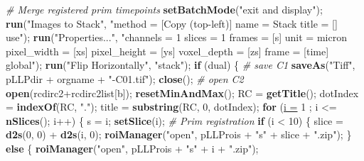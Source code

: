 \documentclass[11pt,singlespacinge,twoside]{reedthesis} %
\newenvironment{Shaded}{}{}
\newcommand{\CommentTok}[1]{\textit{#1}}
\newcommand{\ControlFlowTok}[1]{\textbf{#1}}
\newcommand{\DataTypeTok}[1]{\underline{#1}}
\newcommand{\DecValTok}[1]{#1}
\newcommand{\KeywordTok}[1]{\textbf{#1}}
\newcommand{\NormalTok}[1]{#1}
\newcommand{\OperatorTok}[1]{#1}
\newcommand{\StringTok}[1]{#1}
\theoremstyle{definition}
\theoremstyle{definition}
\theoremstyle{definition}
\theoremstyle{remark}
\begin{document}
\begin{Shaded}
\begin{Highlighting}[numbers=left,,]
    \CommentTok{#   Merge registered prim timepoints}
        \KeywordTok{setBatchMode}\NormalTok{(}\StringTok{"exit and display"}\NormalTok{);}
        \KeywordTok{run}\NormalTok{(}\StringTok{"Images to Stack"}\NormalTok{, }\StringTok{"method = [Copy (top-left)] name = Stack title = [] use"}\NormalTok{);}
        \KeywordTok{run}\NormalTok{(}\StringTok{"Properties..."}\NormalTok{,}
            \StringTok{"channels = 1 slices = 1 frames = [s] unit = micron pixel_width = [xs]}
\StringTok{            pixel_height = [ys] voxel_depth = [zs] frame = [time] global"}\NormalTok{); }
        \KeywordTok{run}\NormalTok{(}\StringTok{"Flip Horizontally"}\NormalTok{, }\StringTok{"stack"}\NormalTok{);}
        \ControlFlowTok{if}\NormalTok{ (dual) \{}
      \CommentTok{# save C1}
          \KeywordTok{saveAs}\NormalTok{(}\StringTok{"Tiff"}\NormalTok{, pLLPdir }\OperatorTok{+}\StringTok{ }\NormalTok{orgname }\OperatorTok{+}\StringTok{ "-C01.tif"}\NormalTok{);}
          \KeywordTok{close}\NormalTok{();}
      \CommentTok{# open C2}
          \KeywordTok{open}\NormalTok{(rcdirc2}\OperatorTok{+}\NormalTok{rcdirc2list[b]);}
            \KeywordTok{resetMinAndMax}\NormalTok{();}
\NormalTok{            RC =}\StringTok{ }\KeywordTok{getTitle}\NormalTok{();}
\NormalTok{            dotIndex =}\StringTok{ }\KeywordTok{indexOf}\NormalTok{(RC, }\StringTok{"."}\NormalTok{);}
\NormalTok{            title =}\StringTok{ }\KeywordTok{substring}\NormalTok{(RC, }\DecValTok{0}\NormalTok{, dotIndex);}
            \ControlFlowTok{for}\NormalTok{ (}\DataTypeTok{i =} \DecValTok{1}\NormalTok{ ; i }\OperatorTok{<=}\StringTok{ }\KeywordTok{nSlices}\NormalTok{(); i}\OperatorTok{++}\NormalTok{) \{}
\NormalTok{                s =}\StringTok{ }\NormalTok{i;}
                \KeywordTok{setSlice}\NormalTok{(i);}
            \CommentTok{#   Prim registration}
                \ControlFlowTok{if}\NormalTok{ (i }\OperatorTok{<}\StringTok{ }\DecValTok{10}\NormalTok{) \{}
\NormalTok{                    slice =}\StringTok{ }\KeywordTok{d2s}\NormalTok{(}\DecValTok{0}\NormalTok{, }\DecValTok{0}\NormalTok{) }\OperatorTok{+}\StringTok{ }\KeywordTok{d2s}\NormalTok{(i, }\DecValTok{0}\NormalTok{);}
                    \KeywordTok{roiManager}\NormalTok{(}\StringTok{"open"}\NormalTok{, pLLProis }\OperatorTok{+}\StringTok{ "s"} \OperatorTok{+}\StringTok{ }\NormalTok{slice }\OperatorTok{+}\StringTok{ ".zip"}\NormalTok{);}
\NormalTok{                \} }\ControlFlowTok{else}\NormalTok{ \{}
                    \KeywordTok{roiManager}\NormalTok{(}\StringTok{"open"}\NormalTok{, pLLProis }\OperatorTok{+}\StringTok{ "s"} \OperatorTok{+}\StringTok{ }\NormalTok{i }\OperatorTok{+}\StringTok{ ".zip"}\NormalTok{);}

\end{Highlighting}
\end{Shaded}
\end{document}
